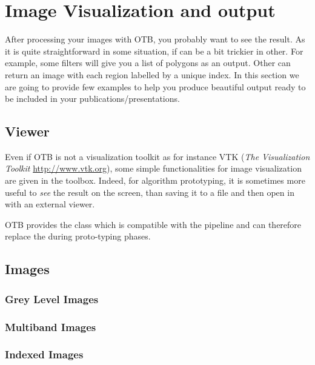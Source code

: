 \chapter{Image Visualization and output}
\label{chap:ImageVisualization}

After processing your images with OTB, you probably want to see the result. As it is quite straightforward in some situation, if can be a bit trickier in other. For example, some filters will give you a list of polygons as an output. Other can return an image with each region labelled by a unique index. In this section we are going to provide few examples to help you produce beautiful output ready to be included in your publications/presentations.


\section{Viewer}
Even if OTB is not a visualization toolkit as for instance VTK
(\emph{The Visualization Toolkit} \url{http://www.vtk.org}), some
simple functionalities for image visualization are given in the
toolbox. Indeed, for algorithm prototyping, it is sometimes more
useful to \emph{see} the result on the screen, than saving it to a
file and then open in with an external viewer.

OTB provides the  class which is compatible
with the pipeline and can therefore replace the
 during proto-typing phases.




\section{Images}

\subsection{Grey Level Images}
\label{sec:ViewingGreyLevelImages}



\subsection{Multiband Images}
\label{sec:ViewingMultibandImages}



\subsection{Indexed Images}
\label{sec:ViewingIndexedImages}





